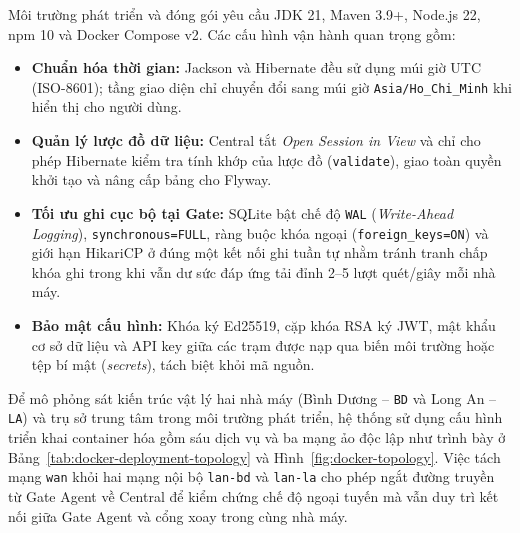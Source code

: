 Môi trường phát triển và đóng gói yêu cầu JDK 21, Maven 3.9+, Node.js 22, npm 10 và Docker Compose
v2. Các cấu hình vận hành quan trọng gồm:
\begin{itemize}
    \item \textbf{Chuẩn hóa thời gian:} Jackson và Hibernate đều sử dụng múi giờ UTC (ISO-8601); tầng
    giao diện chỉ chuyển đổi sang múi giờ \texttt{Asia/Ho\_Chi\_Minh} khi hiển thị cho người dùng.
    \item \textbf{Quản lý lược đồ dữ liệu:} Central tắt \textit{Open Session in View} và chỉ cho phép
    Hibernate kiểm tra tính khớp của lược đồ (\texttt{validate}), giao toàn quyền khởi tạo và nâng
    cấp bảng cho Flyway.
    \item \textbf{Tối ưu ghi cục bộ tại Gate:} SQLite bật chế độ \texttt{WAL} (\textit{Write-Ahead
    Logging}), \texttt{synchronous=FULL}, ràng buộc khóa ngoại (\texttt{foreign\_keys=ON}) và giới
    hạn HikariCP ở đúng một kết nối ghi tuần tự nhằm tránh tranh chấp khóa ghi trong khi vẫn dư sức
    đáp ứng tải đỉnh 2--5 lượt quét/giây mỗi nhà máy.
    \item \textbf{Bảo mật cấu hình:} Khóa ký Ed25519, cặp khóa RSA ký JWT, mật khẩu cơ sở dữ liệu và
    API key giữa các trạm được nạp qua biến môi trường hoặc tệp bí mật (\textit{secrets}), tách biệt
    khỏi mã nguồn.
\end{itemize}

Để mô phỏng sát kiến trúc vật lý hai nhà máy (Bình Dương -- \texttt{BD} và Long An -- \texttt{LA})
và trụ sở trung tâm trong môi trường phát triển, hệ thống sử dụng cấu hình triển khai container hóa
gồm sáu dịch vụ và ba mạng ảo độc lập như trình bày ở Bảng~\ref{tab:docker-deployment-topology} và
Hình~\ref{fig:docker-topology}. Việc
tách mạng \texttt{wan} khỏi hai mạng nội bộ \texttt{lan-bd} và \texttt{lan-la} cho phép ngắt đường
truyền từ Gate Agent về Central để kiểm chứng chế độ ngoại tuyến mà vẫn duy trì kết nối giữa Gate
Agent và cổng xoay trong cùng nhà máy.


